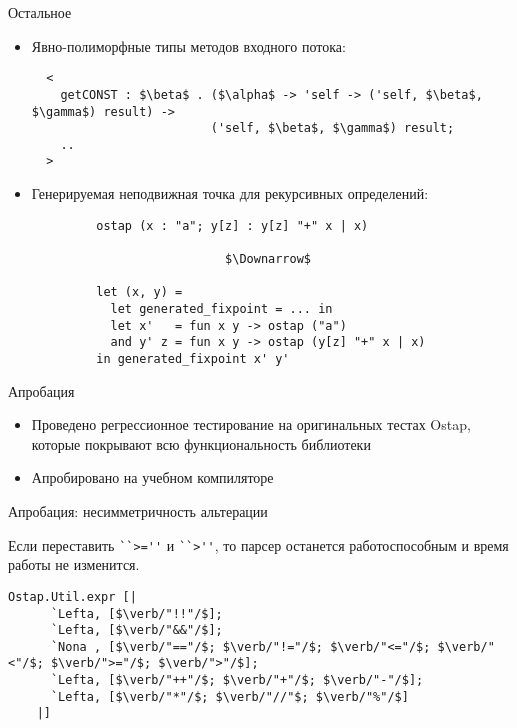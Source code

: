 \documentclass[10pt, mathserif]{beamer}
\theoremstyle{definition}
\begin{document}
\begin{frame}[fragile]{Остальное}

  \begin{itemize}
     \item Явно-полиморфные типы методов входного потока:

       \begin{lstlisting}
  <
    getCONST : $\beta$ . ($\alpha$ -> 'self -> ('self, $\beta$, $\gamma$) result) ->
                         ('self, $\beta$, $\gamma$) result;
    ..
  >
       \end{lstlisting}

     \item Генерируемая неподвижная точка для рекурсивных определений:

       \begin{lstlisting}
         ostap (x : "a"; y[z] : y[z] "+" x | x)

                           $\Downarrow$

         let (x, y) =
           let generated_fixpoint = ... in
           let x'   = fun x y -> ostap ("a")
           and y' z = fun x y -> ostap (y[z] "+" x | x)
         in generated_fixpoint x' y'
       \end{lstlisting}

  \end{itemize}

\end{frame}

\begin{frame}[fragile]{Апробация}
  \begin{itemize}
     \item Проведено регрессионное тестирование на оригинальных тестах Ostap, которые покрывают всю функциональность библиотеки
     \vskip3mm

     \item Апробировано на учебном компиляторе
  \end{itemize}
\end{frame}

\begin{frame}[fragile]{Апробация: несимметричность альтерации}

  Если переставить \lstinline|``>=''| и \lstinline|``>''|, то парсер останется работоспособным и время работы не изменится.

  \begin{lstlisting}[basicstyle=\small]
    Ostap.Util.expr [|
      `Lefta, [$\verb/"!!"/$];
      `Lefta, [$\verb/"&&"/$];
      `Nona , [$\verb/"=="/$; $\verb/"!="/$; $\verb/"<="/$; $\verb/"<"/$; $\verb/">="/$; $\verb/">"/$];
      `Lefta, [$\verb/"++"/$; $\verb/"+"/$; $\verb/"-"/$];
      `Lefta, [$\verb/"*"/$; $\verb/"//"$; $\verb/"%"/$]
    |]
  \end{lstlisting}
  \vskip3mm
\end{frame}
\end{document}
